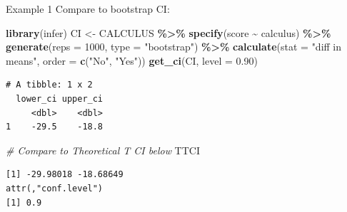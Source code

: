 \documentclass[
  ignorenonframetext,
]{beamer}
\newenvironment{Shaded}{\begin{snugshade}}{\end{snugshade}}
\newcommand{\AttributeTok}[1]{\textcolor[rgb]{0.13,0.29,0.53}{#1}}
\newcommand{\CommentTok}[1]{\textcolor[rgb]{0.56,0.35,0.01}{\textit{#1}}}
\newcommand{\DecValTok}[1]{\textcolor[rgb]{0.00,0.00,0.81}{#1}}
\newcommand{\FloatTok}[1]{\textcolor[rgb]{0.00,0.00,0.81}{#1}}
\newcommand{\FunctionTok}[1]{\textcolor[rgb]{0.13,0.29,0.53}{\textbf{#1}}}
\newcommand{\NormalTok}[1]{#1}
\newcommand{\OtherTok}[1]{\textcolor[rgb]{0.56,0.35,0.01}{#1}}
\newcommand{\SpecialCharTok}[1]{\textcolor[rgb]{0.81,0.36,0.00}{\textbf{#1}}}
\newcommand{\StringTok}[1]{\textcolor[rgb]{0.31,0.60,0.02}{#1}}
\begin{document}
\begin{frame}[fragile]{Example 1}
\protect\hypertarget{example-1-4}{}
Compare to bootstrap CI: \tiny

\begin{Shaded}
\begin{Highlighting}[]
\FunctionTok{library}\NormalTok{(infer)}
\NormalTok{CI }\OtherTok{\textless{}{-}}\NormalTok{ CALCULUS }\SpecialCharTok{\%\textgreater{}\%} 
  \FunctionTok{specify}\NormalTok{(score }\SpecialCharTok{\textasciitilde{}}\NormalTok{ calculus) }\SpecialCharTok{\%\textgreater{}\%} 
  \FunctionTok{generate}\NormalTok{(}\AttributeTok{reps =} \DecValTok{1000}\NormalTok{, }\AttributeTok{type =} \StringTok{"bootstrap"}\NormalTok{) }\SpecialCharTok{\%\textgreater{}\%} 
  \FunctionTok{calculate}\NormalTok{(}\AttributeTok{stat =} \StringTok{"diff in means"}\NormalTok{, }\AttributeTok{order =} \FunctionTok{c}\NormalTok{(}\StringTok{"No"}\NormalTok{, }\StringTok{"Yes"}\NormalTok{))}
\FunctionTok{get\_ci}\NormalTok{(CI, }\AttributeTok{level =} \FloatTok{0.90}\NormalTok{)}
\end{Highlighting}
\end{Shaded}

\begin{verbatim}
# A tibble: 1 x 2
  lower_ci upper_ci
     <dbl>    <dbl>
1    -29.5    -18.8
\end{verbatim}

\begin{Shaded}
\begin{Highlighting}[]
\CommentTok{\# Compare to Theoretical T CI below}
\NormalTok{TTCI}
\end{Highlighting}
\end{Shaded}

\begin{verbatim}
[1] -29.98018 -18.68649
attr(,"conf.level")
[1] 0.9
\end{verbatim}

\normalsize
\end{frame}
\end{document}
